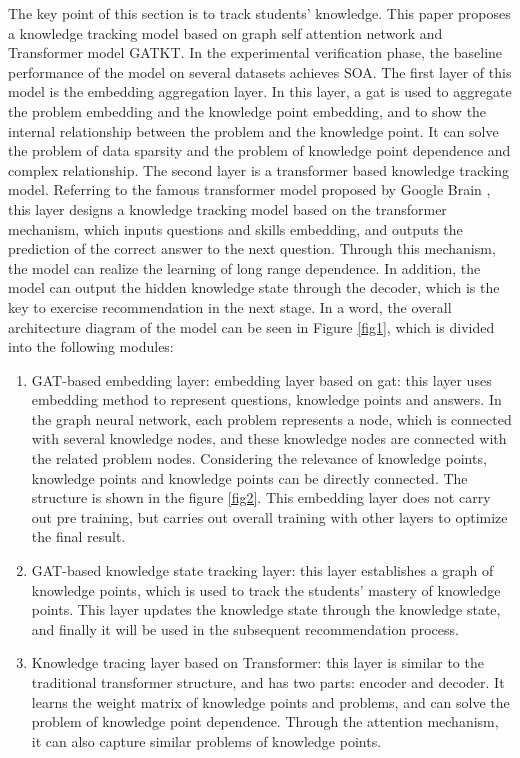 The key point of this section is to track students' knowledge. This paper proposes a knowledge tracking model based on graph self attention network and Transformer model GATKT. In the experimental verification phase, the baseline performance of the model on several datasets achieves SOA. The first layer of this model is the embedding aggregation layer. In this layer, a gat is used to aggregate the problem embedding and the knowledge point embedding, and to show the internal relationship between the problem and the knowledge point. It can solve the problem of data sparsity and the problem of knowledge point dependence and complex relationship. The second layer is a transformer based knowledge tracking model. Referring to the famous transformer model proposed by Google Brain \cite{vaswani2017attention}, this layer designs a knowledge tracking model based on the transformer mechanism, which inputs questions and skills embedding, and outputs the prediction of the correct answer to the next question. Through this mechanism, the model can realize the learning of long range dependence. In addition, the model can output the hidden knowledge state through the decoder, which is the key to exercise recommendation in the next stage. In a word, the overall architecture diagram of the model can be seen in Figure \ref{fig1}, which is divided into the following modules:
\begin{enumerate}
	\item GAT-based embedding layer: embedding layer based on gat: this layer uses embedding method to represent questions, knowledge points and answers. In the graph neural network, each problem represents a node, which is connected with several knowledge nodes, and these knowledge nodes are connected with the related problem nodes. Considering the relevance of knowledge points, knowledge points and knowledge points can be directly connected. The structure is shown in the figure \ref{fig2}. This embedding layer does not carry out pre training, but carries out overall training with other layers to optimize the final result.
	\item GAT-based knowledge state tracking layer: this layer establishes a graph of knowledge points, which is used to track the students' mastery of knowledge points. This layer updates the knowledge state through the knowledge state, and finally it will be used in the subsequent recommendation process.
	\item Knowledge tracing layer based on Transformer: this layer is similar to the traditional transformer structure, and has two parts: encoder and decoder. It learns the weight matrix of knowledge points and problems, and can solve the problem of knowledge point dependence. Through the attention mechanism, it can also capture similar problems of knowledge points.
\end{enumerate}

